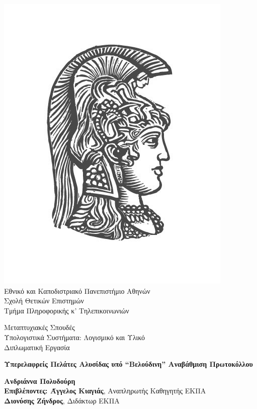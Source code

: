 \begin{center}
    
    \includegraphics[scale=0.8]{figures/logo_uoa.jpg}\\
    {\large Εθνικό και Καποδιστριακό Πανεπιστήμιο Αθηνών \\ 
    Σχολή Θετικών Επιστημών \\ 
    Τμήμα Πληροφορικής κ' Τηλεπικοινωνιών\\}
    \vspace{1cm}
    \begin{LARGE}
        Μεταπτυχιακές Σπουδές \\ 
        Υπολογιστικά Συστήματα: Λογισμικό και Υλικό\\
        \vspace{10mm}
        {Διπλωματική Εργασία}\\
        \vspace{0.8cm}
    \end{LARGE}
    {\textbf{\LARGE Υπερελαφρείς Πελάτες Αλυσίδας υπό ``Βελούδινη'' Αναβάθμιση Πρωτοκόλλου}}\\
    \vspace{2.5cm}


    \textbf{\large Ανδριάννα Πολυδούρη} \\ 
    \vspace{2.5cm} 
    \textbf{\large Επιβλέποντες: Άγγελος Κιαγιάς}\large , Αναπληρωτής Καθηγητής ΕΚΠΑ\\
    \hspace{0.77cm}
    \textbf{\large Διονύσης Ζήνδρος}\large, Διδάκτωρ ΕΚΠΑ
    \vspace{2cm}

    \date{Αθήνα, \\ 15η Ιουνίου 2020}
    \pagebreak
\end{center}